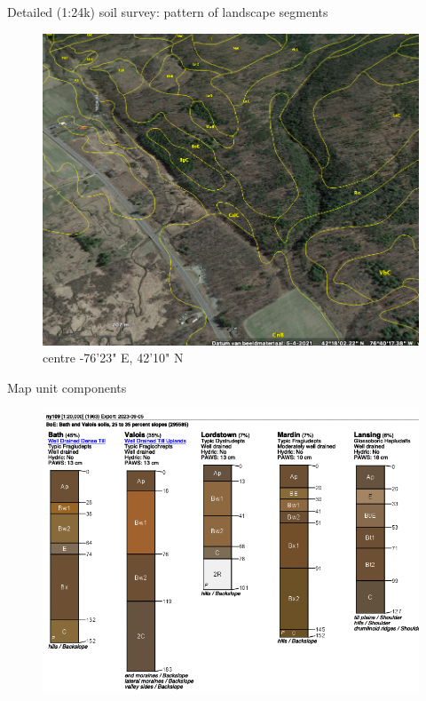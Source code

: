 \documentclass[aspectratio=169, 10pt]{beamer}
\begin{document}
\begin{frame}{Detailed (1:24k) soil survey: pattern of landscape segments}
    \begin{figure}
        \centering
\includegraphics[height=0.7\textheight]{./graphics_david/PonyHollow_SoilWeb_Screenshot_relief.png}\\
{\footnotesize centre -76'23" E, 42'10" N}
     \end{figure}
    \end{frame}

\begin{frame}{Map unit components}
    \begin{figure}
        \centering
\includegraphics[height=0.75\textheight]{./graphics_david/Bath_Valois_profiles.png}
     \end{figure}
    \end{frame}
\end{document}
